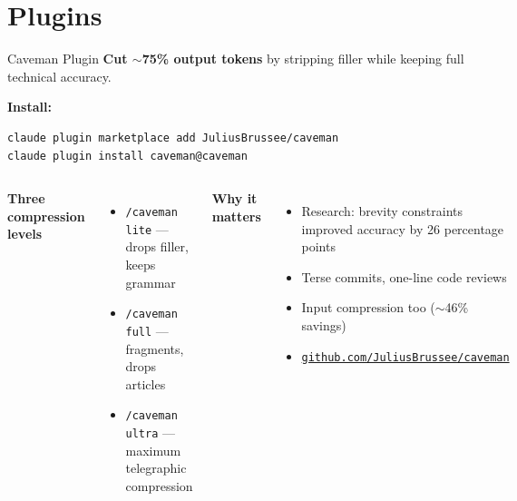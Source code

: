 \documentclass[aspectratio=169]{beamer}
\begin{document}
\section{Plugins}

\begin{frame}[fragile]{Caveman Plugin}
\textbf{Cut $\sim$75\% output tokens} by stripping filler while keeping full technical accuracy.

\smallskip
\textbf{Install:}
\begin{lstlisting}[language=bash]
claude plugin marketplace add JuliusBrussee/caveman
claude plugin install caveman@caveman
\end{lstlisting}

\begin{columns}[T]
\textbf{\color{popblue}Three compression levels}
\begin{itemize}
  \item \texttt{/caveman lite} --- drops filler, keeps grammar
  \item \texttt{/caveman full} --- fragments, drops articles
  \item \texttt{/caveman ultra} --- maximum telegraphic compression
\end{itemize}

\textbf{\color{paramgreen}Why it matters}
\begin{itemize}
  \item Research: brevity constraints improved accuracy by 26 percentage points
  \item Terse commits, one-line code reviews
  \item Input compression too ($\sim$46\% savings)
  \item \href{https://github.com/JuliusBrussee/caveman}{\texttt{github.com/JuliusBrussee/caveman}}
\end{itemize}
\end{columns}
\end{frame}
\end{document}
